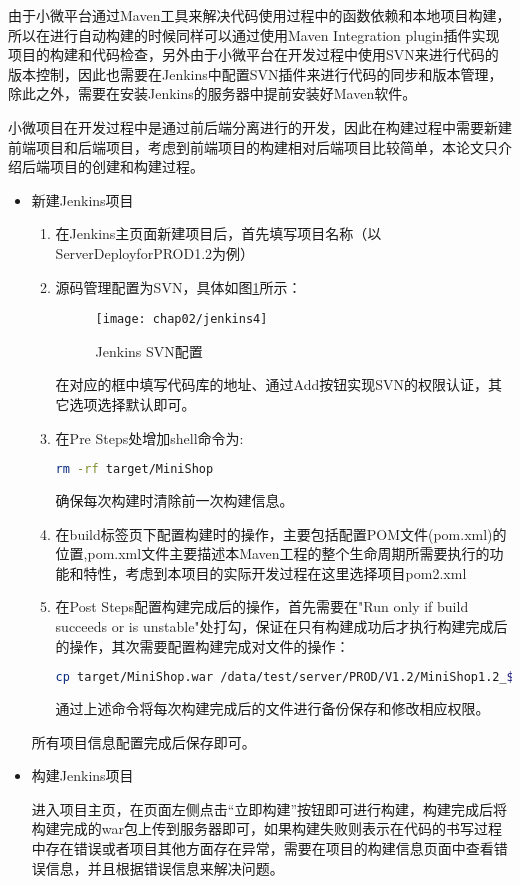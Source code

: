 由于小微平台通过Maven工具来解决代码使用过程中的函数依赖和本地项目构建\cite{董晓光2014使用}，所以在进行自动构建的时候同样可以通过使用Maven Integration plugin插件实现项目的构建和代码检查，另外由于小微平台在开发过程中使用SVN来进行代码的版本控制，因此也需要在Jenkins中配置SVN插件来进行代码的同步和版本管理，除此之外，需要在安装Jenkins的服务器中提前安装好Maven软件。

小微项目在开发过程中是通过前后端分离进行的开发，因此在构建过程中需要新建前端项目和后端项目，考虑到前端项目的构建相对后端项目比较简单，本论文只介绍后端项目的创建和构建过程。
\begin{itemize}
  \item 新建Jenkins项目
  \begin{enumerate}
    \item 在Jenkins主页面新建项目后，首先填写项目名称（以ServerDeployforPROD1.2为例）
    \item 源码管理配置为SVN，具体如图\ref{fig:jenkins4}所示：
      \begin{figure}[H] %
        \centering
        \texttt{[image: chap02/jenkins4]}
        \caption{Jenkins SVN配置}
        \label{fig:jenkins4}
      \end{figure}
      在对应的框中填写代码库的地址、通过Add按钮实现SVN的权限认证，其它选项选择默认即可。
    \item 在Pre Steps处增加shell命令为:
\begin{lstlisting}[language=bash,numbers=none]
rm -rf target/MiniShop
\end{lstlisting}
      确保每次构建时清除前一次构建信息。
    \item 在build标签页下配置构建时的操作，主要包括配置POM文件(pom.xml)的位置,pom.xml文件主要描述本Maven工程的整个生命周期所需要执行的功能和特性\cite{mileva2009mining}，考虑到本项目的实际开发过程在这里选择项目pom2.xml
    \item 在Post Steps配置构建完成后的操作，首先需要在"Run only if build succeeds or is unstable"处打勾，保证在只有构建成功后才执行构建完成后的操作，其次需要配置构建完成对文件的操作：
\begin{lstlisting}[language=bash,numbers=none]
cp target/MiniShop.war /data/test/server/PROD/V1.2/MiniShop1.2_$(date +%Y%m%d)_$BUILD_NUMBER.war && chmod 777 /data/test/server/PROD/V1.2/MiniShop1.2_$(date +%Y%m%d)_$BUILD_NUMBER.war
\end{lstlisting}
      通过上述命令将每次构建完成后的文件进行备份保存和修改相应权限。
  \end{enumerate}
  所有项目信息配置完成后保存即可。
  \item 构建Jenkins项目

  进入项目主页，在页面左侧点击“立即构建”按钮即可进行构建，构建完成后将构建完成的war包上传到服务器即可，如果构建失败则表示在代码的书写过程中存在错误或者项目其他方面存在异常，需要在项目的构建信息页面中查看错误信息，并且根据错误信息来解决问题。
\end{itemize}

